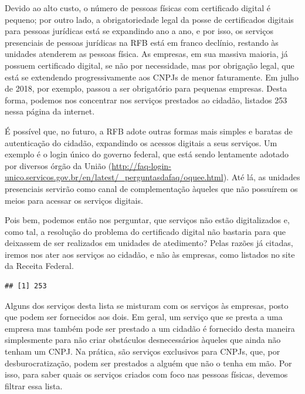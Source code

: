 \documentclass[]{article}
\newenvironment{Shaded}{\begin{snugshade}}{\end{snugshade}}
\newcommand{\CommentTok}[1]{\textcolor[rgb]{0.56,0.35,0.01}{\textit{#1}}}
\newcommand{\KeywordTok}[1]{\textcolor[rgb]{0.13,0.29,0.53}{\textbf{#1}}}
\newcommand{\NormalTok}[1]{#1}
\begin{document}
Devido ao alto custo, o número de pessoas físicas com certificado
digital é pequeno; por outro lado, a obrigatoriedade legal da posse de
certificados digitais para pessoas jurídicas está se expandindo ano a
ano, e por isso, os serviços presenciais de pessoas jurídicas na RFB
está em franco declínio, restando às unidades atenderem as pessoas
física. As empresas, em sua massiva maioria, já possuem certificado
digital, se não por necessidade, mas por obrigação legal, que está se
extendendo progressivamente aos CNPJs de menor faturamente. Em julho de
2018, por exemplo, passou a ser obrigatório para pequenas empresas.
Desta forma, podemos nos concentrar nos serviços prestados ao cidadão,
listados 253 nessa página da internet.

É possível que, no futuro, a RFB adote outras formas mais simples e
baratas de autenticação do cidadão, expandindo os acessos digitais a
seus serviços. Um exemplo é o login único do governo federal, que está
sendo lentamente adotado por diversos órgão da União
(\url{http://faq-login-unico.servicos.gov.br/en/latest/_perguntasdafaq/oquee.html}).
Até lá, as unidades presenciais servirão como canal de complementação
àqueles que não possuírem os meios para acessar os serviços digitais.

Pois bem, podemos então nos perguntar, que serviços não estão
digitalizados e, como tal, a resolução do problema do certificado
digital não bastaria para que deixassem de ser realizados em unidades de
atedimento? Pelas razões já citadas, iremos nos ater aos serviços ao
cidadão, e não às empresas, como listados no site da Receita Federal.

\begin{Shaded}
\end{Shaded}

\begin{verbatim}
## [1] 253
\end{verbatim}

Alguns dos serviços desta lista se misturam com os serviços às empresas,
posto que podem ser fornecidos aos dois. Em geral, um serviço que se
presta a uma empresa mas também pode ser prestado a um cidadão é
fornecido desta maneira simplesmente para não criar obstáculos
desnecessários àqueles que ainda não tenham um CNPJ. Na prática, são
serviços exclusivos para CNPJs, que, por desburocratização, podem ser
prestados a alguém que não o tenha em mão. Por isso, para saber quais os
serviços criados com foco nas pessoas físicas, devemos filtrar essa
lista.
\end{document}
